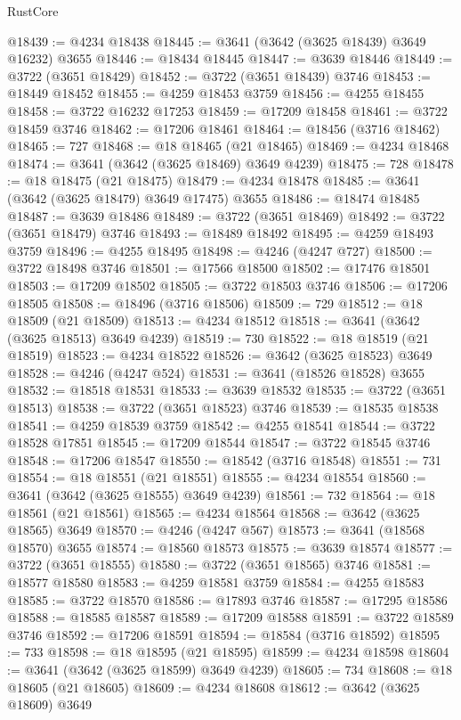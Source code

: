 \begin{lexlean}{RustCore}
\begin{coremodule}
@18439 := @4234 @18438
@18445 := @3641 (@3642 (@3625 @18439) @3649 @16232) @3655
@18446 := @18434 @18445
@18447 := @3639 @18446
@18449 := @3722 (@3651 @18429)
@18452 := @3722 (@3651 @18439) @3746
@18453 := @18449 @18452
@18455 := @4259 @18453 @3759
@18456 := @4255 @18455
@18458 := @3722 @16232 @17253
@18459 := @17209 @18458
@18461 := @3722 @18459 @3746
@18462 := @17206 @18461
@18464 := @18456 (@3716 @18462)
@18465 := 727
@18468 := @18 @18465 (@21 @18465)
@18469 := @4234 @18468
@18474 := @3641 (@3642 (@3625 @18469) @3649 @4239)
@18475 := 728
@18478 := @18 @18475 (@21 @18475)
@18479 := @4234 @18478
@18485 := @3641 (@3642 (@3625 @18479) @3649 @17475) @3655
@18486 := @18474 @18485
@18487 := @3639 @18486
@18489 := @3722 (@3651 @18469)
@18492 := @3722 (@3651 @18479) @3746
@18493 := @18489 @18492
@18495 := @4259 @18493 @3759
@18496 := @4255 @18495
@18498 := @4246 (@4247 @727)
@18500 := @3722 @18498 @3746
@18501 := @17566 @18500
@18502 := @17476 @18501
@18503 := @17209 @18502
@18505 := @3722 @18503 @3746
@18506 := @17206 @18505
@18508 := @18496 (@3716 @18506)
@18509 := 729
@18512 := @18 @18509 (@21 @18509)
@18513 := @4234 @18512
@18518 := @3641 (@3642 (@3625 @18513) @3649 @4239)
@18519 := 730
@18522 := @18 @18519 (@21 @18519)
@18523 := @4234 @18522
@18526 := @3642 (@3625 @18523) @3649
@18528 := @4246 (@4247 @524)
@18531 := @3641 (@18526 @18528) @3655
@18532 := @18518 @18531
@18533 := @3639 @18532
@18535 := @3722 (@3651 @18513)
@18538 := @3722 (@3651 @18523) @3746
@18539 := @18535 @18538
@18541 := @4259 @18539 @3759
@18542 := @4255 @18541
@18544 := @3722 @18528 @17851
@18545 := @17209 @18544
@18547 := @3722 @18545 @3746
@18548 := @17206 @18547
@18550 := @18542 (@3716 @18548)
@18551 := 731
@18554 := @18 @18551 (@21 @18551)
@18555 := @4234 @18554
@18560 := @3641 (@3642 (@3625 @18555) @3649 @4239)
@18561 := 732
@18564 := @18 @18561 (@21 @18561)
@18565 := @4234 @18564
@18568 := @3642 (@3625 @18565) @3649
@18570 := @4246 (@4247 @567)
@18573 := @3641 (@18568 @18570) @3655
@18574 := @18560 @18573
@18575 := @3639 @18574
@18577 := @3722 (@3651 @18555)
@18580 := @3722 (@3651 @18565) @3746
@18581 := @18577 @18580
@18583 := @4259 @18581 @3759
@18584 := @4255 @18583
@18585 := @3722 @18570
@18586 := @17893 @3746
@18587 := @17295 @18586
@18588 := @18585 @18587
@18589 := @17209 @18588
@18591 := @3722 @18589 @3746
@18592 := @17206 @18591
@18594 := @18584 (@3716 @18592)
@18595 := 733
@18598 := @18 @18595 (@21 @18595)
@18599 := @4234 @18598
@18604 := @3641 (@3642 (@3625 @18599) @3649 @4239)
@18605 := 734
@18608 := @18 @18605 (@21 @18605)
@18609 := @4234 @18608
@18612 := @3642 (@3625 @18609) @3649

\end{coremodule}
\end{lexlean}
